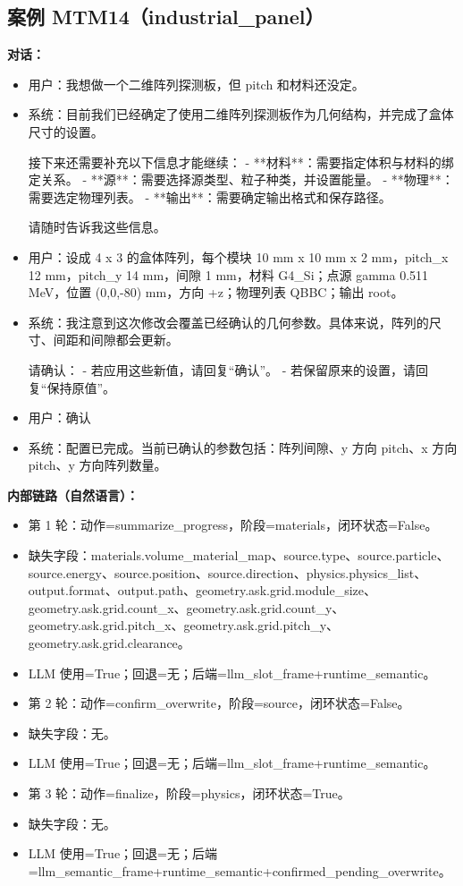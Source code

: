 \documentclass[11pt]{ctexart}
\begin{document}
\subsection{案例 MTM14（industrial\_panel）}
\textbf{对话：}
\begin{itemize}
\item 用户：我想做一个二维阵列探测板，但 pitch 和材料还没定。
\item 系统：目前我们已经确定了使用二维阵列探测板作为几何结构，并完成了盒体尺寸的设置。

接下来还需要补充以下信息才能继续：
- **材料**：需要指定体积与材料的绑定关系。
- **源**：需要选择源类型、粒子种类，并设置能量。
- **物理**：需要选定物理列表。
- **输出**：需要确定输出格式和保存路径。

请随时告诉我这些信息。
\item 用户：设成 4 x 3 的盒体阵列，每个模块 10 mm x 10 mm x 2 mm，pitch\_x 12 mm，pitch\_y 14 mm，间隙 1 mm，材料 G4\_Si；点源 gamma 0.511 MeV，位置 (0,0,-80) mm，方向 +z；物理列表 QBBC；输出 root。
\item 系统：我注意到这次修改会覆盖已经确认的几何参数。具体来说，阵列的尺寸、间距和间隙都会更新。

请确认：
- 若应用这些新值，请回复“确认”。
- 若保留原来的设置，请回复“保持原值”。
\item 用户：确认
\item 系统：配置已完成。当前已确认的参数包括：阵列间隙、y 方向 pitch、x 方向 pitch、y 方向阵列数量。
\end{itemize}
\textbf{内部链路（自然语言）：}
\begin{itemize}
\item 第 1 轮：动作=summarize\_progress，阶段=materials，闭环状态=False。
\item 缺失字段：materials.volume\_material\_map、source.type、source.particle、source.energy、source.position、source.direction、physics.physics\_list、output.format、output.path、geometry.ask.grid.module\_size、geometry.ask.grid.count\_x、geometry.ask.grid.count\_y、geometry.ask.grid.pitch\_x、geometry.ask.grid.pitch\_y、geometry.ask.grid.clearance。
\item LLM 使用=True；回退=无；后端=llm\_slot\_frame+runtime\_semantic。
\item 第 2 轮：动作=confirm\_overwrite，阶段=source，闭环状态=False。
\item 缺失字段：无。
\item LLM 使用=True；回退=无；后端=llm\_slot\_frame+runtime\_semantic。
\item 第 3 轮：动作=finalize，阶段=physics，闭环状态=True。
\item 缺失字段：无。
\item LLM 使用=True；回退=无；后端=llm\_semantic\_frame+runtime\_semantic+confirmed\_pending\_overwrite。
\end{itemize}
\end{document}
